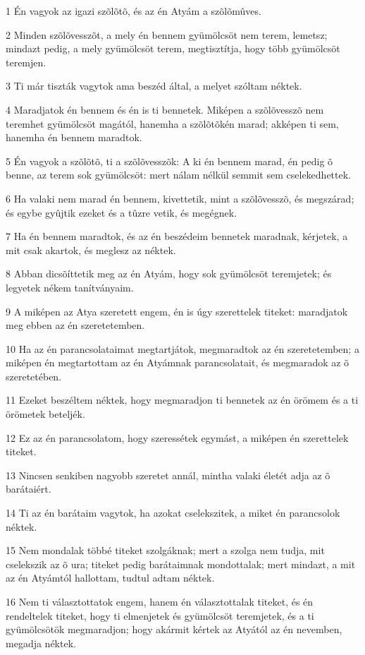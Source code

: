 \par 1 Én vagyok az igazi szõlõtõ, és az én Atyám a szõlõmûves.
\par 2 Minden szõlõvesszõt, a mely én bennem gyümölcsöt nem terem, lemetsz; mindazt pedig, a mely gyümölcsöt terem, megtisztítja, hogy több gyümölcsöt teremjen.
\par 3 Ti már tiszták vagytok ama beszéd által, a melyet szóltam néktek.
\par 4 Maradjatok én bennem és én is ti bennetek. Miképen a szõlõvesszõ nem teremhet gyümölcsöt magától, hanemha a szõlõtõkén marad; akképen ti sem, hanemha én bennem maradtok.
\par 5 Én vagyok a szõlõtõ, ti a szõlõvesszõk: A ki én bennem marad, én pedig õ benne, az terem sok gyümölcsöt: mert nálam nélkül semmit sem cselekedhettek.
\par 6 Ha valaki nem marad én bennem, kivettetik, mint a szõlõvesszõ, és megszárad; és egybe gyûjtik ezeket és a tûzre vetik, és megégnek.
\par 7 Ha én bennem maradtok, és az én beszédeim bennetek maradnak, kérjetek, a mit csak akartok, és meglesz az néktek.
\par 8 Abban dicsõíttetik meg az én Atyám, hogy sok gyümölcsöt teremjetek; és legyetek nékem tanítványaim.
\par 9 A miképen az Atya szeretett engem, én is úgy szerettelek titeket: maradjatok meg ebben az én szeretetemben.
\par 10 Ha az én parancsolataimat megtartjátok, megmaradtok az én szeretetemben; a miképen én megtartottam az én Atyámnak parancsolatait, és megmaradok az õ szeretetében.
\par 11 Ezeket beszéltem néktek, hogy megmaradjon ti bennetek az én örömem és a ti örömetek beteljék.
\par 12 Ez az én parancsolatom, hogy szeressétek  egymást, a miképen én szerettelek titeket.
\par 13 Nincsen senkiben nagyobb szeretet annál, mintha valaki életét adja az õ barátaiért.
\par 14 Ti az én barátaim vagytok, ha azokat cselekszitek, a miket én parancsolok néktek.
\par 15 Nem mondalak többé titeket szolgáknak; mert a szolga nem tudja, mit cselekszik az õ ura; titeket pedig barátaimnak mondottalak; mert mindazt, a mit az én Atyámtól hallottam, tudtul adtam néktek.
\par 16 Nem ti választottatok engem, hanem én választottalak titeket, és én rendeltelek titeket, hogy ti elmenjetek és gyümölcsöt teremjetek, és a ti gyümölcsötök megmaradjon; hogy akármit kértek az Atyától  az én nevemben, megadja néktek.
